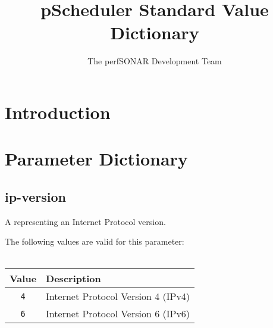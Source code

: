 \documentclass[10pt]{article}
\title{pScheduler Standard Value Dictionary}
\author{The perfSONAR Development Team}
\begin{document}
\maketitle


%
%


\def\valids#1{
  {The following values are valid for this parameter:}\\
  \\
  \hspace*{4em}\begin{tabular}{|c|l|}
    \hline
        {\bf Value} & {\bf Description} \\
        \hline
        #1
        \hline
  \end{tabular}
}

\def\value#1#2{{\tt #1} & {#2}\\}



%
%

\section{Introduction}



%
%

\section{Parameter Dictionary}



\subsection{ip-version}
A  representing an Internet Protocol version.

\valids{
  \value{4}{Internet Protocol Version 4 (IPv4)}
  \value{6}{Internet Protocol Version 6 (IPv6)}
}
\end{document}

